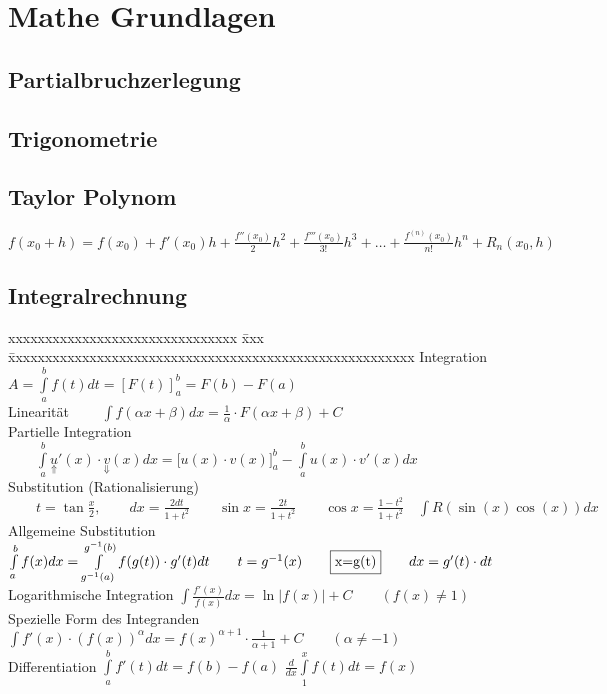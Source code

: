 \section{Mathe Grundlagen}	

	\subsection{Partialbruchzerlegung}
		
			
	\subsection{Trigonometrie}
			
			
	\subsection{Taylor Polynom}
		$f(x_0+h)=f(x_0) + f'(x_0)h + \frac{f''(x_0)}{2}h^2 + \frac{f'''(x_0)}{3!}h^3 + \ldots + \frac{f^{(n)}(x_0)}{n!}h^n + R_n(x_0, h)$

	\subsection{Integralrechnung}	
	\begin{tabbing}
	     xxxxxxxxxxxxxxxxxxxxxxxxxxxxxxx \= xxx \= xxxxxxxxxxxxxxxxxxxxxxxxxxxxxxxxxxxxxxxxxxxxxxxxxxxxxxx\kill  
	     Integration\>\>$A=\int\limits_{a}^{b}{f(t)dt}=\left[F(t)\right]_a^b=F(b)-F(a)$\\[0.2cm]
	     Linearität\>		  
	   $\qquad\int{f(\alpha x+\beta )dx=\frac{1}{\alpha}\cdot F(\alpha x+
				\beta)+C}$\\[0.2cm]
		   Partielle Integration\>
	   $\qquad\int\limits_a^b{\underset{\Uparrow}{u}'(x)\cdot \underset{\Downarrow}{v}(x)dx}=\biggl[ u(x)\cdot v(x) \biggr]_a^b
	   -\int\limits_a^b{u(x)\cdot v'(x)dx}$\\[0.2cm]
	   Substitution (Rationalisierung)\>
	   $\qquad t=\tan\frac{x}{2}, \qquad dx=\frac{2dt}{1+t^2} \qquad 
	   \sin  x=\frac{2t}{1+t^2} \qquad \cos x=\frac{1-t^2}{1+t^2}
				\quad\int{R(\sin(x)\cos(x))dx}$\\ 
	   Allgemeine Substitution \> \>
				$\int\limits_{a}^{b}{f(x)dx}=\int\limits_{g^{-1}(a)}^{g^{-1}(b)}{f(g(t))\cdot
				g'(t)dt}\qquad t=g^{-1}(x)\qquad  \fbox{x=g(t)}\qquad dx=g'(t)\cdot dt$\\
	   Logarithmische Integration \>\>
	    $ \int{\frac{f'(x)}{f(x)}dx}=\ln|f(x)|+C	\qquad{(f(x)\neq 1)}$\\[0.2cm]
	  Spezielle Form des Integranden \>\>
		 		$\int{f'(x)\cdot (f(x))^{\alpha} dx}= f(x)^{\alpha +1}\cdot
		 		\frac{1}{\alpha+1}+C \qquad{(\alpha \neq -1)}$\\ 
	   Differentiation\>\>
		 		$\int \limits ^{b} _{a} {f'(t)dt}=f(b)-f(a)$\qquad
				$\frac{d}{dx} \int \limits ^{x} _{1} {f(t)dt}=f(x)$
	\end{tabbing}
	
